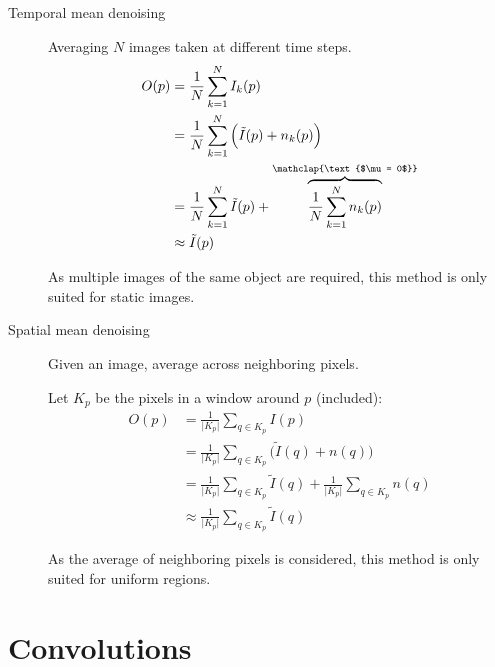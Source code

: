 \begin{description}
    \item[Temporal mean denoising] 
        Averaging $N$ images taken at different time steps.
        \[ 
            \begin{split}
                O(p) &= \frac{1}{N} \sum_{k=1}^{N} I_k(p) \\
                    &= \frac{1}{N} \sum_{k=1}^{N} \Big( \tilde{I}(p) + n_k(p) \Big) \\
                    &= \frac{1}{N} \sum_{k=1}^{N} \tilde{I}(p) + \overbrace{\frac{1}{N} \sum_{k=1}^{N} n_k(p)}^{\mathclap{\text{$\mu = 0$}}} \\
                    &\approx \tilde{I}(p)
            \end{split}
        \]

        \begin{remark}
            As multiple images of the same object are required, this method is only suited for static images.
        \end{remark}

    \item[Spatial mean denoising] 
        Given an image, average across neighboring pixels.

        Let $K_p$ be the pixels in a window around $p$ (included):
        \[ 
            \begin{split}
                O(p) &= \frac{1}{\vert K_p \vert} \sum_{q \in K_p} I(p) \\
                    &= \frac{1}{\vert K_p \vert} \sum_{q \in K_p} \Big( \tilde{I}(q) + n(q) \Big) \\
                    &= \frac{1}{\vert K_p \vert} \sum_{q \in K_p} \tilde{I}(q) + \frac{1}{\vert K_p \vert} \sum_{q \in K_p} n(q) \\
                    &\approx \frac{1}{\vert K_p \vert} \sum_{q \in K_p} \tilde{I}(q)
            \end{split}
        \]

        \begin{remark}
            As the average of neighboring pixels is considered, this method is only suited for uniform regions.
        \end{remark}
\end{description}



\section{Convolutions}


